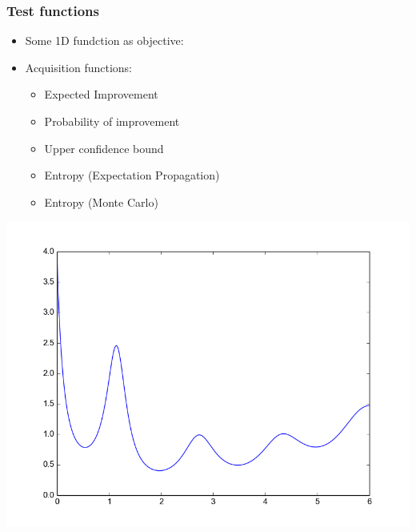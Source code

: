 \documentclass[10pt,handout]{beamer}
\begin{document}






\begin{frame}
\frametitle{Test functions}
\begin{minipage}{0.55\textwidth}
\begin{itemize}
\item Some 1D fundction as objective:
\item Acquisition functions:
\begin{itemize}
\item Expected Improvement
\item Probability of improvement
\item Upper confidence bound
\item Entropy (Expectation Propagation)
\item Entropy (Monte Carlo)
\end{itemize}
\end{itemize}  
\end{minipage}%
\begin{minipage}{0.43\textwidth}
\includegraphics[width=\textwidth]{self_constructed_oned.png}
\end{minipage}
\end{frame}
\end{document}

